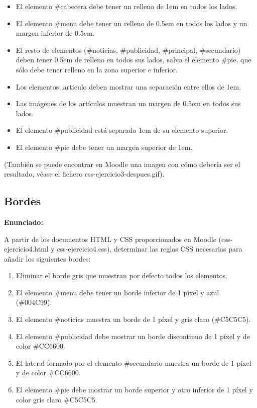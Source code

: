 \begin{itemize}
  \item El elemento \#cabecera debe tener un relleno de 1em en todos los lados.
  \item El elemento \#menu debe tener un relleno de 0.5em en todos los lados y un margen inferior de 0.5em.
  \item El resto de elementos (\#noticias, \#publicidad, \#principal, \#secundario) deben tener 0.5em de relleno en todos sus lados, salvo el elemento \#pie, que sólo debe tener relleno en la zona superior e inferior.
  \item Los elementos .articulo deben mostrar una separación entre ellos de 1em.
  \item Las imágenes de los artículos muestran un margen de 0.5em en todos sus lados.
  \item El elemento \#publicidad está separado 1em de su elemento superior.
  \item El elemento \#pie debe tener un margen superior de 1em.
\end{itemize}

(También se puede encontrar en Moodle una imagen con cómo debería ser el resultado, 
véase el fichero css-ejercicio3-despues.gif).


\subsection{Bordes}
\label{subsec:bordes}

\textbf{Enunciado:}

A partir de los documentos HTML y CSS proporcionados en Moodle (css-ejercicio4.html y css-ejercicio4.css), determinar las reglas CSS necesarias para añadir los siguientes bordes:

\begin{enumerate}
  \item Eliminar el borde gris que muestran por defecto todos los elementos.
  \item El elemento \#menu debe tener un borde inferior de 1 píxel y azul (\#004C99).
  \item El elemento \#noticias muestra un borde de 1 píxel y gris claro (\#C5C5C5).
  \item El elemento \#publicidad debe mostrar un borde discontinuo de 1 píxel y de color \#CC6600.
  \item El lateral formado por el elemento \#secundario muestra un borde de 1 píxel y de color \#CC6600.
  \item El elemento \#pie debe mostrar un borde superior y otro inferior de 1 píxel y color gris claro \#C5C5C5.
\end{enumerate}

